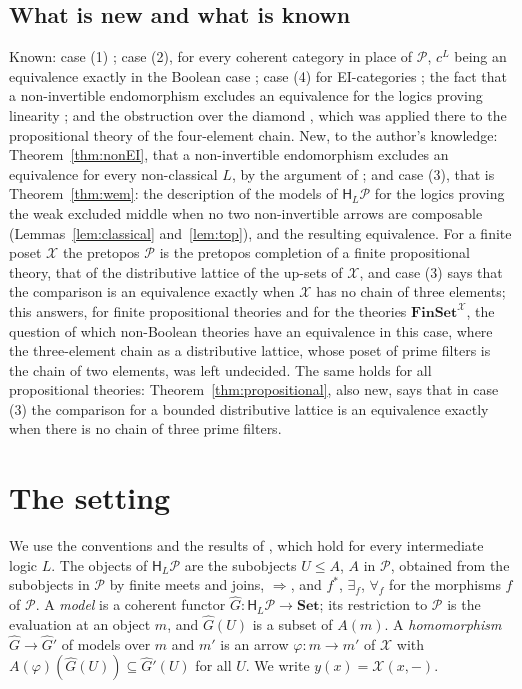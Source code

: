 \documentclass[11pt]{amsart}
\theoremstyle{definition}
\newcommand{\Set}{\mathbf{Set}}
\newcommand{\Fin}{\mathbf{FinSet}}
\newcommand{\HH}{\mathsf H}
\newcommand{\cX}{\mathcal X}
\newcommand{\cP}{\mathcal P}
\begin{document}
\subsection*{What is new and what is known}
Known: case (1) \cite[Prop.~5.3]{Strings}; case (2), for every coherent
category in place of $\cP$, $c^L$ being an equivalence exactly in the
Boolean case \cite[Thm.~1.1(1)]{Interm}; case (4) for EI-categories
\cite[Thm.~1.1, Thm.~6.15]{Strings}; the fact that a non-invertible
endomorphism excludes an equivalence for the logics proving linearity
\cite[Thm.~7.1]{Strings}; and the obstruction over the diamond
\cite[Prop.~5.1]{Interm}, which was applied there to the propositional
theory of the four-element chain. New, to the author's knowledge:
Theorem~\ref{thm:nonEI}, that a non-invertible endomorphism excludes
an equivalence for every non-classical $L$, by the argument of
\cite[Thm.~7.1]{Strings}; and case (3), that is
Theorem~\ref{thm:wem}: the description of the models of $\HH_L\cP$ for
the logics proving the weak excluded middle when no two non-invertible
arrows are composable (Lemmas~\ref{lem:classical}
and~\ref{lem:top}), and the resulting equivalence. For a finite poset
$\cX$ the pretopos $\cP$ is the pretopos completion of a finite
propositional theory, that of the distributive lattice of the up-sets
of $\cX$, and case (3)
says that the comparison is an equivalence exactly when $\cX$ has no
chain of three elements; this answers, for finite propositional
theories and for the theories $\Fin^{\cX}$, the question of
\cite[\S8]{Interm} which non-Boolean theories have an equivalence in
this case, where the three-element chain as a distributive lattice,
whose poset of prime filters is the chain of two elements, was left
undecided. The same holds for all propositional theories:
Theorem~\ref{thm:propositional}, also new, says that in case (3) the
comparison for a bounded distributive lattice is an equivalence
exactly when there is no chain of three prime filters.

\section{The setting}\label{sec:setting}

We use the conventions and the results of \cite[\S2]{Strings}, which
hold for every intermediate logic $L$. The objects of $\HH_L\cP$ are
the subobjects $U\le A$, $A$ in $\cP$, obtained from the subobjects in
$\cP$ by finite meets and joins, $\Rightarrow$, and $f^*$,
$\exists_f$, $\forall_f$ for the morphisms $f$ of $\cP$. A
\emph{model} is a coherent functor $\hat G\colon\HH_L\cP\to\Set$; its
restriction to $\cP$ is the evaluation at an object $m$, and $\hat
G(U)$ is a subset of $A(m)$. A \emph{homomorphism} $\hat G\to\hat G'$
of models over $m$ and $m'$ is an arrow $\varphi\colon m\to m'$ of
$\cX$ with $A(\varphi)(\hat G(U))\subseteq\hat G'(U)$ for all $U$. We
write $y(x)=\cX(x,-)$.
\end{document}
